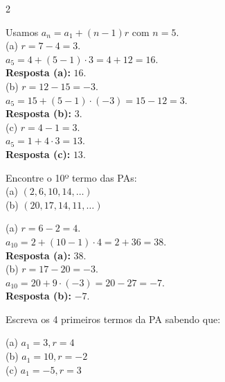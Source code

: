 \documentclass[11pt]{article}
\begin{document}
\begin{multicols}{2}
\begin{tcolorbox}[colback=green!10,colframe=green!60!black, title=\textbf{Solução da questão 2 }, text width=0.9\columnwidth]
Usamos $a_n = a_1 + (n-1)r$ com $n=5$. \\

(a) $r=7-4=3$. \\
$a_5 = 4 + (5-1)\cdot 3 = 4 + 12 = 16$. \\
\textbf{Resposta (a):} $16$. \\

(b) $r=12-15=-3$. \\
$a_5 = 15 + (5-1)\cdot(-3) = 15 -12 = 3$. \\
\textbf{Resposta (b):} $3$. \\

(c) $r=4-1=3$. \\
$a_5 = 1 + 4\cdot 3 = 13$. \\
\textbf{Resposta (c):} $13$.
\end{tcolorbox}

\begin{tcolorbox}[colback=blue!8,colframe=blue!60!black, title=\textbf{Questão 3 }, text width=0.9\columnwidth]
Encontre o 10º termo das PAs: \\
(a) $(2,6,10,14,\ldots)$ \\ (b) $(20,17,14,11,\ldots)$
\end{tcolorbox}

\begin{tcolorbox}[colback=green!10,colframe=green!60!black, title=\textbf{Solução da questão 3 }, text width=0.9\columnwidth]
(a) $r=6-2=4$. \\
$a_{10} = 2 + (10-1)\cdot 4 = 2 + 36 = 38$. \\
\textbf{Resposta (a):} $38$. \\

(b) $r=17-20=-3$. \\
$a_{10} = 20 + 9\cdot(-3) = 20 -27 = -7$. \\
\textbf{Resposta (b):} $-7$. \\
\end{tcolorbox}

\begin{tcolorbox}[colback=blue!8,colframe=blue!60!black, title=\textbf{Questão 4 }, text width=0.9\columnwidth]
Escreva os 4 primeiros termos da PA sabendo que: 

(a) $a_1=3, r=4$ \\ (b) $a_1=10, r=-2$ \\ (c) $a_1=-5, r=3$
\end{tcolorbox}


\end{multicols}
\end{document}
